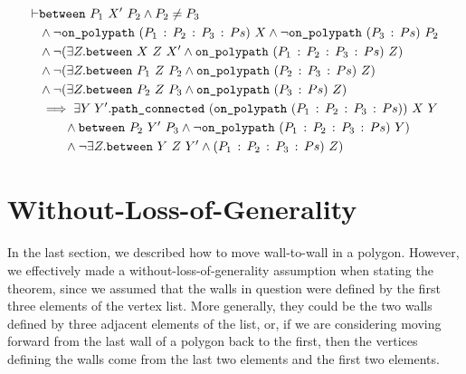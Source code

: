 \begin{equation}\label{eq:PolygonMove}
  \begin{split}
\vdash    &\texttt{between}\ P_1\ X'\ P_2 \wedge P_2 \neq P_3\\
    &\wedge \neg\texttt{on\_polypath}\ (P_1\,:\,P_2\,:\,P_3\,:\,Ps)\ X \wedge \neg\texttt{on\_polypath}\ (P_3\,:\,Ps)\ P_2\\
    &\wedge \neg(\exists Z. \texttt{between}\ X\ Z\ X' \wedge \texttt{on\_polypath}\ (P_1\,:\,P_2\,:\,P_3\,:\,Ps)\ Z)\\
    &\wedge \neg(\exists Z. \texttt{between}\ P_1\ Z\ P_2 \wedge \texttt{on\_polypath}\ (P_2\,:\,P_3\,:\,Ps)\ Z)\\
    &\wedge \neg(\exists Z. \texttt{between}\ P_2\ Z\ P_3 \wedge \texttt{on\_polypath}\ (P_3\,:\,Ps)\ Z)\\
    &\implies \exists Y\; Y'. \texttt{path\_connected}\ (\texttt{on\_polypath}\ (P_1\,:\,P_2\,:\,P_3\,:\,Ps))\ X\ Y\\
    &\qquad\wedge \texttt{between}\ P_2\ Y'\ P_3\wedge \neg\texttt{on\_polypath}\ (P_1\,:\,P_2\,:\,P_3\,:\,Ps)\ Y)\\
    &\qquad\wedge \neg\exists Z. \texttt{between}\ Y\ Z\ Y' \wedge (P_1\,:\,P_2\,:\,P_3\,:\,Ps)\ Z)
  \end{split}
\end{equation}

\section{Without-Loss-of-Generality}\label{sec:PolygonRotation}
In the last section, we described how to move wall-to-wall in a polygon. However, we effectively made a without-loss-of-generality assumption when stating the theorem, since we assumed that the walls in question were defined by the first three elements of the vertex list. More generally, they could be the two walls defined by  three adjacent elements of the list, or, if we are considering moving forward from the last wall of a polygon back to the first, then the vertices defining the walls come from the last two elements and the first two elements.

